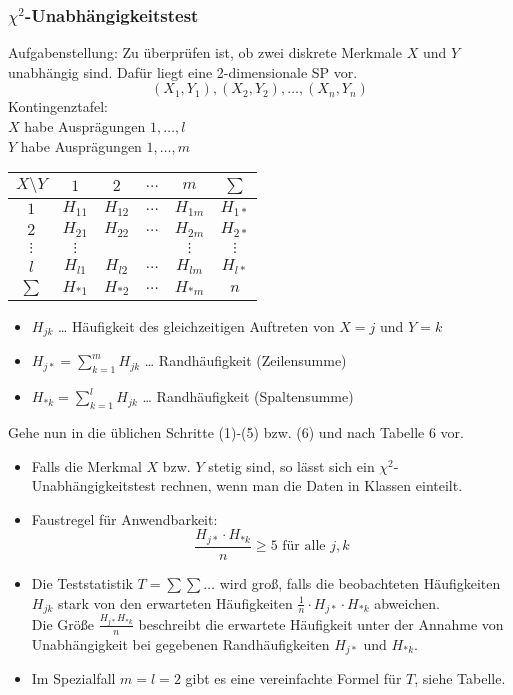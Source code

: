 \subsubsection[chi-quadrat-Unabhängigkeitstest]{$\chi^2$-Unabhängigkeitstest}
Aufgabenstellung: Zu überprüfen ist, ob zwei diskrete Merkmale $X$ und $Y$ unabhängig sind. Dafür liegt eine 2-dimensionale SP vor.
$$(X_1,Y_1), (X_2, Y_2), \ldots, (X_n, Y_n)$$
Kontingenztafel:\\
$X$ habe Ausprägungen $1, \ldots, l$\\
$Y$ habe Ausprägungen $1, \ldots, m$\\
\begin{tabular}{c | c c c c | c}
$X\setminus Y$ & $1$ & $2$ & $\dots$ & $m$ & $\sum$\\\hline
$1$ & $H_{11}$ & $H_{12}$ & $\dots$ & $H_{1m}$ & $H_{1 *}$\\
$2$ & $H_{21}$ & $H_{22}$ & $\dots$ & $H_{2m}$ & $H_{2 *}$\\
$\vdots$ & $\vdots$ &  &  & $\vdots$ & $\vdots$\\
$l$ & $H_{l1}$ & $H_{l2}$ & $\dots$ & $H_{lm}$ & $H_{l *}$\\\hline
$\sum$ & $H_{* 1}$ & $H_{* 2}$ & $\dots$ & $H_{* m}$ & $n$
\end{tabular}
\begin{itemize}
\item $H_{jk}$ … Häufigkeit des gleichzeitigen Auftreten von $X=j$ und $Y=k$
\item $H_{j*}=\sum_{k=1}^m H_{jk}$ … Randhäufigkeit (Zeilensumme)
\item $H_{* k} =\sum_{k=1}^l H_{jk}$ … Randhäufigkeit (Spaltensumme)
\end{itemize}
Gehe nun in die üblichen Schritte (1)-(5) bzw. (6) und nach Tabelle 6 vor.

\begin{itemize}
\item Falls die Merkmal $X$ bzw. $Y$ stetig sind, so lässt sich ein $\chi^2$-Unabhängigkeitstest rechnen, wenn man die Daten in Klassen einteilt.
\item Faustregel für Anwendbarkeit:
$$\frac{H_{j*} \cdot H_{* k}}{n}\geq 5 \text{ für alle }j,k$$
\item Die Teststatistik $T=\sum\sum \dots$ wird groß, falls die beobachteten Häufigkeiten $H_{jk}$ stark von den erwarteten Häufigkeiten $\frac{1}{n}\cdot H_{j*} \cdot H_{*k}$ abweichen.\\
Die Größe $\frac{H_{j*}H_{*k}}{n}$ beschreibt die erwartete Häufigkeit unter der Annahme von Unabhängigkeit bei gegebenen Randhäufigkeiten $H_{j*}$ und $H_{*k}$.
\item Im Spezialfall $m=l=2$ gibt es eine vereinfachte Formel für $T$, siehe Tabelle.
\end{itemize}


